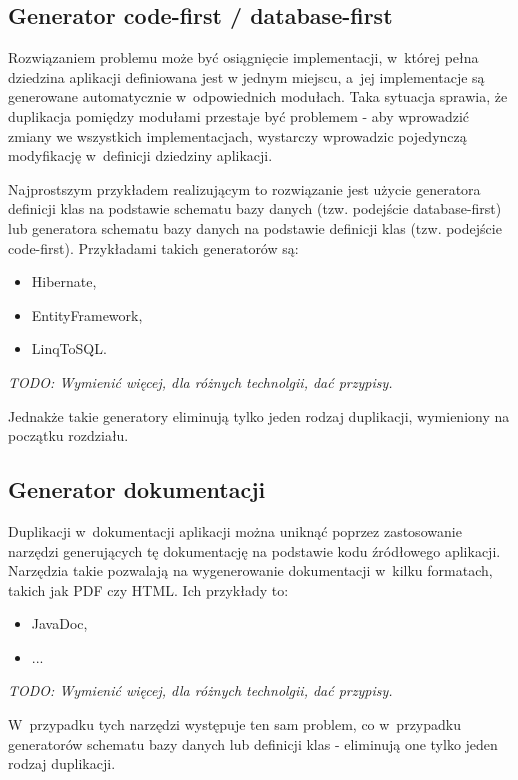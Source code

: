 \subsection{Generator code-first / database-first}

Rozwiązaniem problemu może być osiągnięcie implementacji, w~której pełna dziedzina aplikacji definiowana jest w jednym miejscu, a~jej implementacje są generowane automatycznie w~odpowiednich modułach.
Taka sytuacja sprawia, że duplikacja pomiędzy modułami przestaje być problemem - aby wprowadzić zmiany we wszystkich implementacjach, wystarczy wprowadzic pojedynczą modyfikację w~definicji dziedziny aplikacji.

Najprostszym przykładem realizującym to rozwiązanie jest użycie generatora definicji klas na podstawie schematu bazy danych (tzw. podejście database-first) lub generatora schematu bazy danych na podstawie definicji klas (tzw. podejście code-first).
Przykładami takich generatorów są:

\begin{itemize}
 \item Hibernate,
 \item EntityFramework,
 \item LinqToSQL.
\end{itemize}

\emph{TODO: Wymienić więcej, dla różnych technolgii, dać przypisy.}

Jednakże takie generatory eliminują tylko jeden rodzaj duplikacji, wymieniony na początku rozdziału.


\subsection{Generator dokumentacji}

Duplikacji w~dokumentacji aplikacji można uniknąć poprzez zastosowanie narzędzi generujących tę dokumentację na podstawie kodu źródłowego aplikacji.
Narzędzia takie pozwalają na wygenerowanie dokumentacji w~kilku formatach, takich jak PDF czy HTML.
Ich przykłady to:

\begin{itemize}
 \item JavaDoc,
 \item ...
\end{itemize}

\emph{TODO: Wymienić więcej, dla różnych technolgii, dać przypisy.}

W~przypadku tych narzędzi występuje ten sam problem, co w~przypadku generatorów schematu bazy danych lub definicji klas - eliminują one tylko jeden rodzaj duplikacji.


